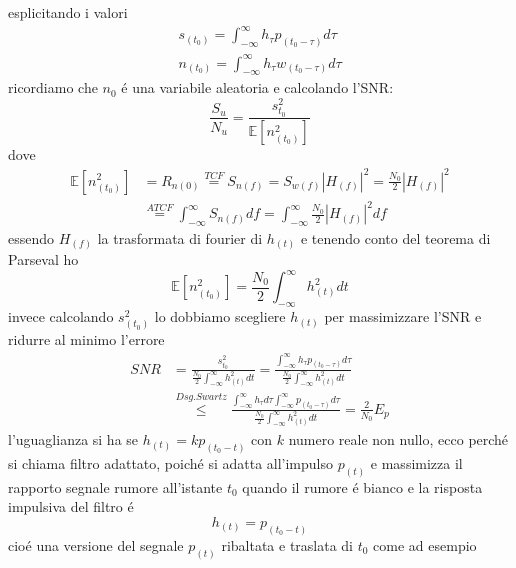         esplicitando i valori
        \begin{gather}
            s_{(t_0)} = \int_{-\infty}^{\infty} h_{\tau} p_{(t_0-\tau)}d\tau \nonumber\\
            n_{(t_0)} = \int_{-\infty}^{\infty} h_{\tau} w_{(t_0-\tau)}d\tau \nonumber
        \end{gather}
        ricordiamo che $n_0$ é una variabile aleatoria e calcolando l'SNR:
        \[
            \frac{S_u}{N_u} = \frac{s^2_{t_0}}{\mathbb{E}[n^2_{(t_0)}]}  
        \]
        dove 
        \begin{align}
            \mathbb{E}[n^2_{(t_0)}] &= R_{n(0)} \overset{TCF}{=} S_{n(f)} = S_{w(f)}\left|H_{(f)}\right|^2 = \frac{N_0}{2}\left|H_{(f)}\right|^2 \nonumber \\
                                    &\overset{ATCF}{=} \int_{-\infty}^{\infty} S_{n(f)} df = \int_{-\infty}^{\infty} \frac{N_0}{2}\left|H_{(f)}\right|^2 df \nonumber            
        \end{align}
        essendo $H_{(f)}$ la trasformata di fourier di $h_{(t)}$ e tenendo conto del teorema di Parseval ho
        \[
            \mathbb{E}[n^2_{(t_0)}] = \frac{N_0}{2}\int_{-\infty}^{\infty} h_{(t)}^2 dt
        \]
        invece calcolando $s^2_{(t_0)}$ lo dobbiamo scegliere $h_{(t)}$ per massimizzare l'SNR e ridurre al minimo l'errore
        \begin{align}
            SNR &= \frac{s^2_{t_0}}{\frac{N_0}{2}\int_{-\infty}^{\infty} h_{(t)}^2 dt} = \frac{\int_{-\infty}^{\infty} h_{\tau} p_{(t_0-\tau)}d\tau}{\frac{N_0}{2}\int_{-\infty}^{\infty} h_{(t)}^2 dt} \nonumber \\
                &\overset{Dsg. Swartz}{\leq} \frac{\int_{-\infty}^{\infty} h_{\tau}d\tau \int_{-\infty}^{\infty} p_{(t_0-\tau)}d\tau}{\frac{N_0}{2}\int_{-\infty}^{\infty} h_{(t)}^2 dt} = \frac{2}{N_0}E_p \nonumber
        \end{align}        
        l'uguaglianza si ha se $h_{(t)} = kp_{(t_0-t)}$ con $k$ numero reale non nullo, ecco perché si chiama filtro adattato, poiché si adatta all'impulso $p_{(t)}$ e 
        massimizza il rapporto segnale rumore all'istante $t_0$ quando il rumore é bianco e la risposta impulsiva del filtro é 
        \[
            h_{(t)} = p_{(t_0-t)}  
        \]     
        cioé una versione del segnale $p_{(t)}$ ribaltata e traslata di $t_{0}$ come ad esempio 
